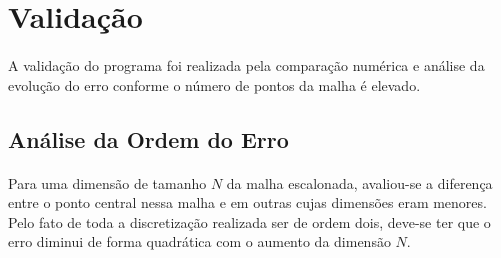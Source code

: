\documentclass[validacao.tex]{subfiles}
\begin{document}
\section{Validação}
\paragraph{} A validação do programa foi realizada pela comparação numérica e análise da evolução do erro conforme o número de pontos da malha é elevado.

\subsection{Análise da Ordem do Erro}
\paragraph{} Para uma dimensão de tamanho $N$ da malha escalonada, avaliou-se a diferença entre o ponto central nessa malha e em outras cujas dimensões eram menores. Pelo fato de toda a discretização realizada ser de ordem dois, deve-se ter que o erro diminui de forma quadrática com o aumento da dimensão $N$.
\end{document}
